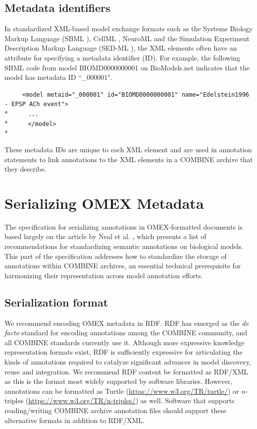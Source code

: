 \documentclass[pdftex,rgb,dvipsnames,svgnames,hyperref,table]{report}
\begin{document}
\subsection{Metadata identifiers}
In standardized XML-based model exchange formats such as the Systems Biology Markup Language (SBML \cite{SBML2003}), CellML \cite{CellML2003}, NeuroML \cite{NeuroML} and the Simulation Experiment Description Markup Language (SED-ML \cite{SEDML}), the XML elements often have an attribute for specifying a metadata identifier (ID). For example, the following SBML code from model BIOMD0000000001 on BioModels.net indicates that the model has metadata ID ``\_000001".

\verb|     <model metaid="_000001" id="BIOMD0000000001" name="Edelstein1996 - EPSP ACh event">|\\*
\verb|     ...|\\*
\verb|     </model>|\\*

These metadata IDs are unique to each XML element and are used in annotation statements to link annotations to the XML elements in a COMBINE archive that they describe.
  
\section{Serializing OMEX Metadata}
The specification for serializing annotations in OMEX-formatted documents is based largely on the article by Neal et al. \cite{Neal2019}, which presents a list of recommendations for standardizing semantic annotations on biological models. This part of the specification addresses how to standardize the storage of annotations within COMBINE archives, an essential technical prerequisite for harmonizing their representation across model annotation efforts.

\subsection{Serialization format}
We recommend encoding OMEX metadata in RDF. RDF has emerged as the \textit{de facto} standard for encoding annotations among the COMBINE community, and all COMBINE standards currently use it. Although more expressive knowledge representation formats exist, RDF is sufficiently expressive for articulating the kinds of annotations required to catalyze significant advances in model discovery, reuse and integration. We recommend RDF content be formatted as RDF/XML as this is the format most widely supported by software libraries. However, annotations can be formatted as Turtle (\href{https://www.w3.org/TR/turtle/}{https://www.w3.org/TR/turtle/}) or $n$-triples (\url{https://www.w3.org/TR/n-triples/}) as well. Software that supports reading/writing COMBINE archive annotation files should support these alternative formats in addition to RDF/XML.
\end{document}
